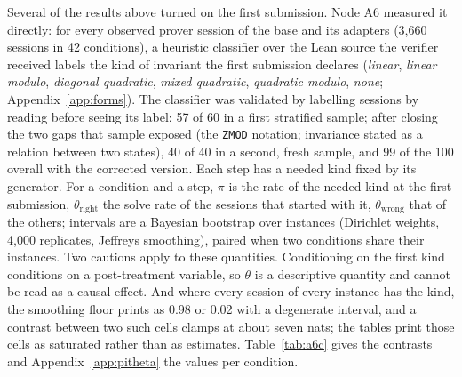 \documentclass[11pt]{article}
\begin{document}
Several of the results above turned on the first submission. Node A6 measured it directly: for every observed prover session of the base and its
adapters (3,660 sessions in 42 conditions), a heuristic classifier over
the Lean source the verifier received labels the kind of invariant the
first submission declares (\emph{linear}, \emph{linear modulo},
\emph{diagonal quadratic}, \emph{mixed quadratic}, \emph{quadratic modulo},
\emph{none}; Appendix~\ref{app:forms}). The classifier was validated by
labelling sessions by reading before seeing its label: 57 of 60 in a
first stratified sample; after closing the two gaps that sample exposed
(the \texttt{ZMOD} notation; invariance stated as a relation between two
states), 40 of 40 in a second, fresh sample, and 99 of the 100 overall
with the corrected version. Each step has a needed kind fixed by its
generator. For a condition and a step, $\pi$ is the rate of the needed
kind at the first submission, $\theta_{\text{right}}$ the solve rate of the
sessions that started with it, $\theta_{\text{wrong}}$ that of the others;
intervals are a Bayesian bootstrap over instances (Dirichlet weights,
4,000 replicates, Jeffreys smoothing), paired when two conditions share
their instances. Two cautions apply to these quantities. Conditioning on the first kind
conditions on a post-treatment variable, so $\theta$ is a descriptive quantity and cannot be read as a causal effect. And where every session of every instance
has the kind, the smoothing floor prints as 0.98 or 0.02 with a degenerate
interval, and a contrast between two such cells clamps at about seven
nats; the tables print those cells as saturated rather than as estimates.
Table~\ref{tab:a6c} gives the contrasts and Appendix~\ref{app:pitheta}
the values per condition.

\begin{table}[!htbp]
\centering\footnotesize
\setlength{\tabcolsep}{4pt}
\resizebox{\textwidth}{!}{}
\caption{Contrasts in nats (difference of logits), median and 90\% interval of the Bayesian bootstrap; rows share their instances and are paired. ``sat.'': both cells at the smoothing floor or ceiling, a clamp rather than a measured difference. Descriptive; no rule.}
\label{tab:a6c}
\end{table}
\end{document}
